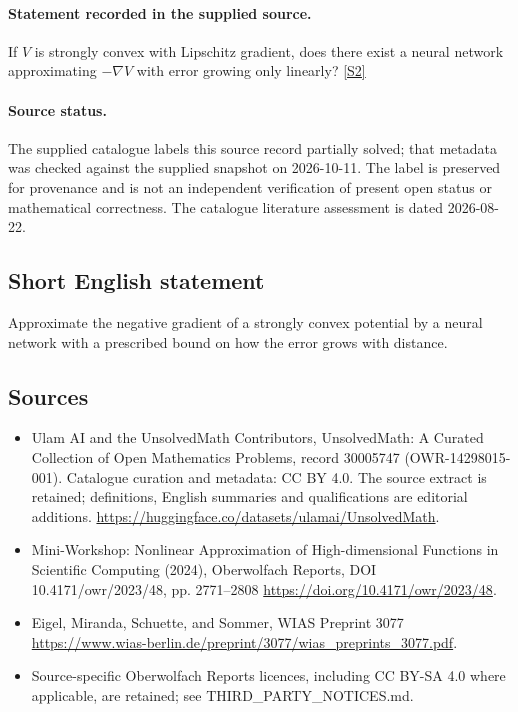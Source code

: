\documentclass[11pt]{article}
\begin{document}
\paragraph{Statement recorded in the supplied source.}
If $V$ is strongly convex with Lipschitz gradient, does there exist a neural network approximating $-\nabla V$ with error growing only linearly? \href{https://doi.org/10.4171/owr/2023/48}{[S2]}
\paragraph{Source status.}
The supplied catalogue labels this source record partially solved; that metadata was checked against the supplied snapshot on 2026-10-11. The label is preserved for provenance and is not an independent verification of present open status or mathematical correctness. The catalogue literature assessment is dated 2026-08-22.
\subsection{Short English statement}
Approximate the negative gradient of a strongly convex potential by a neural network with a prescribed bound on how the error grows with distance.
\subsection{Sources}
\begin{itemize}
\item[S1] Ulam AI and the UnsolvedMath Contributors, UnsolvedMath: A Curated Collection of Open Mathematics Problems, record 30005747 (OWR-14298015-001). Catalogue curation and metadata: CC BY 4.0. The source extract is retained; definitions, English summaries and qualifications are editorial additions.
\url{https://huggingface.co/datasets/ulamai/UnsolvedMath}.
\item[S2] Mini-Workshop: Nonlinear Approximation of High-dimensional Functions in Scientific Computing (2024), Oberwolfach Reports, DOI 10.4171/owr/2023/48, pp. 2771--2808
\url{https://doi.org/10.4171/owr/2023/48}.
\item[S3] Eigel, Miranda, Schuette, and Sommer, WIAS Preprint 3077
\url{https://www.wias-berlin.de/preprint/3077/wias_preprints_3077.pdf}.
\item Source-specific Oberwolfach Reports licences, including CC BY-SA 4.0 where applicable, are retained; see THIRD\_PARTY\_NOTICES.md.
\end{itemize}
\end{document}
